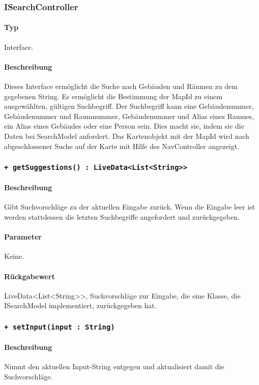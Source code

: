 \subsubsection{ISearchController}
\paragraph*{Typ}
Interface.
\paragraph*{Beschreibung}
Dieses Interface ermöglicht die Suche nach Gebäuden und Räumen zu dem gegebenen String. 
Es ermöglicht die Bestimmung der MapId zu einem ausgewählten, gültigen Suchbegriff. 
Der Suchbegriff kann eine Gebäudenummer, Gebäudenummer und Raumnummer, Gebäudenummer und Alias eines Raumes, ein Alias eines Gebäudes oder eine Person sein.
Dies macht sie, indem sie die Daten bei SearchModel anfordert.
Das Kartenobjekt mit der MapId wird nach abgeschlossener Suche auf der Karte mit Hilfe des NavController angezeigt.


\subsubsection*{\texttt{+ getSuggestions() : LiveData<List<String>>}}%
\paragraph*{Beschreibung}
Gibt Suchvorschläge zu der aktuellen Eingabe zurück.
Wenn die Eingabe leer ist werden stattdessen die letzten Suchbegriffe angefordert und zurückgegeben.
\paragraph*{Parameter}
Keine.
\paragraph*{Rückgabewert}
LiveData<List<String>>, Suchvorschläge zur Eingabe, die eine Klasse, die ISearchModel implementiert, zurückgegeben hat.

\subsubsection*{\texttt{+ setInput(input : String)}}%
\paragraph*{Beschreibung}
Nimmt den aktuellen Input-String entgegen und aktualisiert damit die Suchvorschläge.
